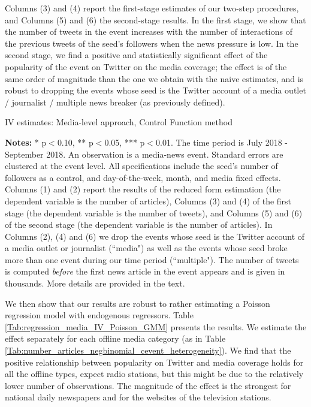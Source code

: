 Columns (3) and (4) report the first-stage estimates of our two-step procedures, and Columns (5) and (6) the second-stage results. In the first stage, we show that the number of tweets in the event increases with the number of interactions of the previous tweets of the seed's followers when the news pressure is low. In the second stage, we find a positive and statistically significant effect of the popularity of the event on Twitter on the media coverage; the effect is of the same order of magnitude than the one we obtain with the naive estimates,  and is robust to dropping the events whose seed is the Twitter account of a media outlet / journalist / multiple news breaker (as previously defined).


\begin{table}
\caption{IV estimates: Media-level approach, Control Function method}
\begin{center}
	
\end{center}
\begin{spacing}{0.5}
	{\fns \textbf{Notes:} * p$<$0.10, ** p$<$0.05, *** p$<$0.01. The time period is July 2018 - September 2018.  An observation is a media-news event. Standard errors are clustered at the event level. All specifications include the seed's number of followers as a control, and day-of-the-week, month, and media fixed effects. Columns (1) and (2) report the results of the reduced form estimation (the dependent variable is the number of articles), Columns (3) and (4) of the first stage (the dependent variable is the number of tweets), and Columns (5) and (6) of the second stage (the dependent variable is the number of articles). In Columns (2), (4) and (6) we drop the events whose seed is the Twitter account of a media outlet or journalist (``media") as well as the events whose seed broke more than one event during our time period (``multiple"). The number of tweets is computed \textit{before} the first news article in the event appears and is given in thousands. More details are provided in the text.}
\end{spacing}
\label{Tab:regression_media_IV_CF}
\end{table} 


We then show that our results are robust to rather estimating a Poisson regression model with endogenous regressors. Table \ref{Tab:regression_media_IV_Poisson_GMM} presents the results. We estimate the effect separately for each offline media category (as in Table \ref{Tab:number_articles_negbinomial_cevent_heterogeneity}). We find that the positive relationship between popularity on Twitter and media coverage holds for all the offline types, expect radio stations, but this might be due to the relatively lower number of observations. The magnitude of the effect is the strongest for national daily newspapers and for the websites of the television stations.


